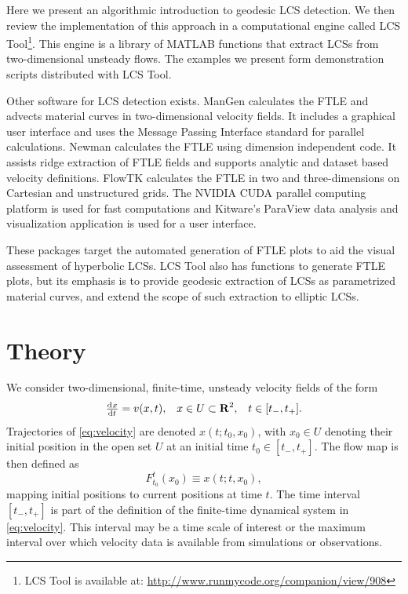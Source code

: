 \documentclass[5p]{elsarticle}
\begin{document}
\begin{sloppypar}
Here we present an algorithmic introduction to geodesic LCS detection.
We then review the implementation of this approach in a computational engine called LCS Tool\footnote{LCS Tool is available at: \url{http://www.runmycode.org/companion/view/908}}.
This engine is a library of MATLAB functions that extract LCSs from two-dimensional unsteady flows. The examples we present form demonstration scripts distributed with LCS Tool.
\end{sloppypar}

\begin{sloppypar}
Other software for LCS detection exists.
ManGen\citep{lekien03:_time} calculates the FTLE and advects material curves in two-dimensional velocity fields.
It includes a graphical user interface and uses the Message Passing Interface standard for parallel calculations.
Newman\citep{toit10:_trans} calculates the FTLE using dimension independent code.
It assists ridge extraction of FTLE fields and supports analytic and dataset based velocity definitions.
FlowTK\citep{ameli14:_devel_effic_flexib_pipel_lagran} calculates the FTLE in two and three-dimensions on Cartesian and unstructured grids.
The NVIDIA CUDA parallel computing platform is used for fast computations and Kitware's ParaView data analysis and visualization application is used for a user interface.
\end{sloppypar}

\begin{sloppypar}
These packages target the automated generation of FTLE plots to aid the visual assessment of hyperbolic LCSs.
LCS Tool also has functions to generate FTLE plots, but its emphasis is to provide geodesic extraction of LCSs as parametrized material curves, and extend the scope of such extraction to elliptic LCSs.
\end{sloppypar}

\section{Theory}

We consider two-dimensional, finite-time, unsteady velocity fields of the form
\begin{align}
\od{x}{t} = v(x,t), && x \in U \subset \mathbf R^2, && t \in [t_-,t_+].
\label{eq:velocity}
\end{align}
Trajectories of \cref{eq:velocity} are denoted $x(t;t_0,x_0)$, with $x_0 \in U$ denoting their initial position in the open set $U$ at an initial time $t_0 \in [t_-,t_+]$. The flow map is then defined as
\[
F_{t_0}^t(x_0) \equiv x(t;t,x_0),
\]
mapping initial positions to current positions at time $t$. The time interval $[t_-,t_+]$ is part of the definition of the finite-time dynamical system in \cref{eq:velocity}. This interval may be a time scale of interest or the maximum interval over which velocity data is available from simulations or observations.
\end{document}
